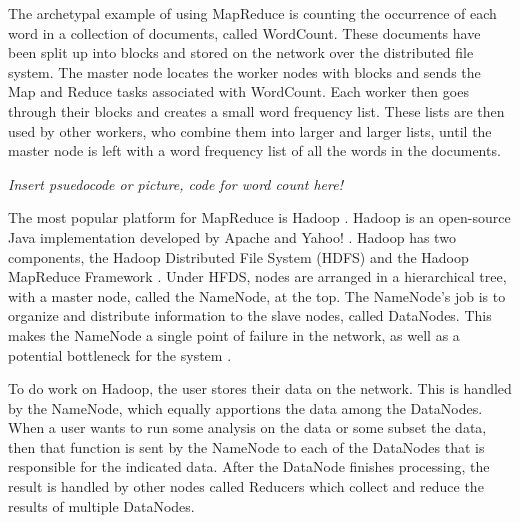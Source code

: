 \documentclass[10pt, conference, compsocconf]{IEEEtran}
\begin{document}
The archetypal example of using MapReduce is counting the occurrence of each word in a collection of documents, called WordCount.  These documents have been split up into blocks and stored on the network over the distributed file system.  The master node locates the worker nodes with blocks and sends the Map and Reduce tasks associated with WordCount.  Each worker then goes through their blocks and creates a small word frequency list.  These lists are then used by other workers, who combine them into larger and larger lists, until the master node is left with a word frequency list of all the words in the documents. 

\textit{Insert psuedocode or picture, code for word count here!}

The most popular platform for MapReduce is Hadoop \cite{Hadoop}. Hadoop is an open-source Java implementation developed by Apache and Yahoo! \cite{pavlo2009comparison}.  Hadoop has two components, the Hadoop Distributed File System (HDFS) and the Hadoop MapReduce Framework \cite{mrsurvey} \cite{shvachko2010hadoop}.  Under HFDS, nodes are arranged in a hierarchical tree, with a master node, called the NameNode, at the top.  The NameNode's job is to organize and distribute information to the slave nodes, called DataNodes.  This makes the NameNode a single point of failure \cite{shvachko2010hadoop} in the network, as well as a potential bottleneck for the system \cite{hadoop-bottle}.

To do work on Hadoop, the user stores their data on the network.  This is handled by the NameNode, which equally apportions the data among the DataNodes.  When a user wants to run some analysis on the data or some subset the data, then that function is sent by the NameNode to each of the DataNodes that is responsible for the indicated data.   After the DataNode finishes processing, the result is handled by other nodes called Reducers which collect and reduce the results of multiple DataNodes.

\end{document}
